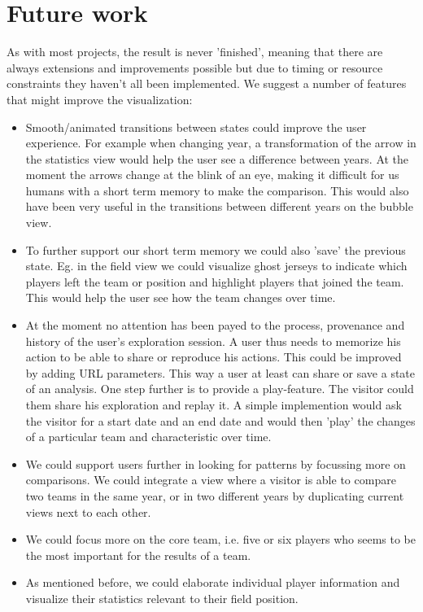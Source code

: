 \documentclass[]{sigchi}
\begin{document}
\section{Future work}\label{sec:futurework}
As with most projects, the result is never 'finished', meaning that there are
always extensions and improvements possible but due to timing or resource constraints they haven't all been implemented. We suggest a number of features that might improve the visualization:
\begin{itemize}
    \item Smooth/animated transitions between states could improve the user experience.
        For example when changing year, a transformation of the arrow in the
        statistics view would help the user see a difference between years.  At
        the moment the arrows change at the blink of an eye, making it difficult
        for us humans with a short term memory to make the comparison. This
        would also have been very useful in the transitions between different
        years on the bubble view.
    \item To further support our short term memory we could also 'save' the
        previous state. Eg. in the field view we could visualize ghost jerseys
        to indicate which players left the team or position and highlight
        players that joined the team.  This would help the user see how the team
        changes over time.
    \item At the moment no attention has been payed to the process, provenance
        and history of the user's exploration session. A user thus needs to
        memorize his action to be able to share or reproduce his actions. This
        could be improved by adding URL parameters. This way a user at least can
        share or save a state of an analysis. One step further is to provide a
        play-feature. The visitor could them share his exploration and replay
        it. A simple implemention would ask the visitor for a start date and an
        end date and would then 'play' the changes of a particular team and
        characteristic over time.
    \item We could support users further in looking for patterns by focussing
        more on comparisons. We could integrate a view where a visitor is able
        to compare two teams in the same year, or in two different years by duplicating current views next to each other.
    \item We could focus more on the core team, i.e. five or six players who seems 
        to be the most important for the results of a team.
    \item As mentioned before, we could elaborate individual player information and visualize their statistics relevant to their field position.

\end{itemize}
\end{document}
